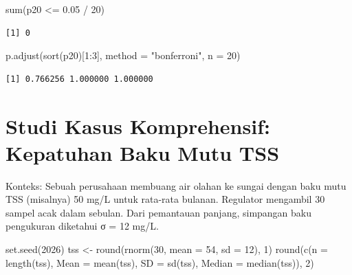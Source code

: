 \documentclass[
  indonesian,
  letterpaper,
]{book}
\newenvironment{Shaded}{\begin{snugshade}}{\end{snugshade}}
\newcommand{\AttributeTok}[1]{\textcolor[rgb]{0.40,0.45,0.13}{#1}}
\newcommand{\DecValTok}[1]{\textcolor[rgb]{0.68,0.00,0.00}{#1}}
\newcommand{\FloatTok}[1]{\textcolor[rgb]{0.68,0.00,0.00}{#1}}
\newcommand{\FunctionTok}[1]{\textcolor[rgb]{0.28,0.35,0.67}{#1}}
\newcommand{\NormalTok}[1]{\textcolor[rgb]{0.00,0.23,0.31}{#1}}
\newcommand{\OtherTok}[1]{\textcolor[rgb]{0.00,0.23,0.31}{#1}}
\newcommand{\SpecialCharTok}[1]{\textcolor[rgb]{0.37,0.37,0.37}{#1}}
\newcommand{\StringTok}[1]{\textcolor[rgb]{0.13,0.47,0.30}{#1}}
\begin{document}
\begin{Shaded}
\begin{Highlighting}[]
\FunctionTok{sum}\NormalTok{(p20 }\SpecialCharTok{\textless{}=} \FloatTok{0.05} \SpecialCharTok{/} \DecValTok{20}\NormalTok{)}
\end{Highlighting}
\end{Shaded}

\begin{verbatim}
[1] 0
\end{verbatim}

\begin{Shaded}
\begin{Highlighting}[]
\FunctionTok{p.adjust}\NormalTok{(}\FunctionTok{sort}\NormalTok{(p20)[}\DecValTok{1}\SpecialCharTok{:}\DecValTok{3}\NormalTok{], }\AttributeTok{method =} \StringTok{"bonferroni"}\NormalTok{, }\AttributeTok{n =} \DecValTok{20}\NormalTok{)}
\end{Highlighting}
\end{Shaded}

\begin{verbatim}
[1] 0.766256 1.000000 1.000000
\end{verbatim}

\section{Studi Kasus Komprehensif: Kepatuhan Baku Mutu
TSS}\label{studi-kasus-komprehensif-kepatuhan-baku-mutu-tss}

Konteks: Sebuah perusahaan membuang air olahan ke sungai dengan baku
mutu TSS (misalnya) 50 mg/L untuk rata-rata bulanan. Regulator mengambil
30 sampel acak dalam sebulan. Dari pemantauan panjang, simpangan baku
pengukuran diketahui σ = 12 mg/L.

\begin{Shaded}
\begin{Highlighting}[]
\FunctionTok{set.seed}\NormalTok{(}\DecValTok{2026}\NormalTok{)}
\NormalTok{tss }\OtherTok{\textless{}{-}} \FunctionTok{round}\NormalTok{(}\FunctionTok{rnorm}\NormalTok{(}\DecValTok{30}\NormalTok{, }\AttributeTok{mean =} \DecValTok{54}\NormalTok{, }\AttributeTok{sd =} \DecValTok{12}\NormalTok{), }\DecValTok{1}\NormalTok{)}
\FunctionTok{round}\NormalTok{(}\FunctionTok{c}\NormalTok{(}\AttributeTok{n =} \FunctionTok{length}\NormalTok{(tss), }\AttributeTok{Mean =} \FunctionTok{mean}\NormalTok{(tss), }\AttributeTok{SD =} \FunctionTok{sd}\NormalTok{(tss), }\AttributeTok{Median =} \FunctionTok{median}\NormalTok{(tss)), }\DecValTok{2}\NormalTok{)}
\end{Highlighting}
\end{Shaded}
\end{document}
